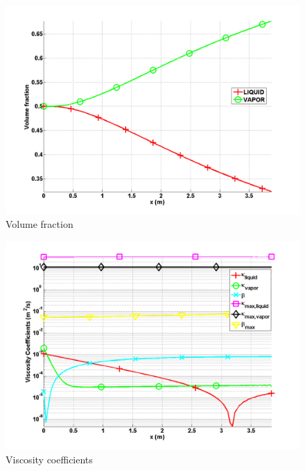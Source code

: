         \begin{figure}[H]
                \centering
                \includegraphics[width=\textwidth]{figures/SEM/ANS_WINTER_2014_7Eqn_volume_fraction.png}
                \caption{Volume fraction}
                \label{fig:volume_fraction}
        \end{figure}        
%
        \begin{figure}[H]
                \centering
                \includegraphics[width=\textwidth]{figures/SEM/ANS_WINTER_2014_7Eqn_viscosity.png}
                \caption{Viscosity coefficients}
                \label{fig:viscosity_coeff}
        \end{figure}        
%
